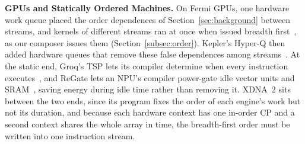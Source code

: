 \textbf{GPUs and Statically Ordered Machines.}
On Fermi GPUs, one hardware work queue placed the order dependences of Section~\ref{sec:background} between streams, and kernels of different streams ran at once when issued breadth first~\citep{rennich2012streams}, as our composer issues them (Section~\ref{subsec:order}).
Kepler's Hyper-Q then added hardware queues that remove these false dependences among streams~\citep{nvidia-kepler-gk110}.
At the static end, Groq's TSP lets its compiler determine when every instruction executes~\citep{abts2020tsp}, and ReGate lets an NPU's compiler power-gate idle vector units and SRAM~\citep{xue2025regate}, saving energy during idle time rather than removing it.
XDNA~2 sits between the two ends, since its program fixes the order of each engine's work but not its duration, and because each hardware context has one in-order CP and a second context shares the whole array in time, the breadth-first order must be written into one instruction stream.

